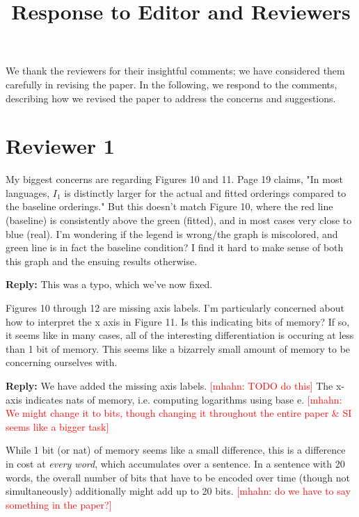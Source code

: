\documentclass{article}[11pt,a4paper,oneside]
\title{Response to Editor and Reviewers}
\newcommand\mhahn[1]{\textcolor{red}{[mhahn: #1]}}
\newenvironment{reply}
  {\par\medskip
   \color{blue}%
   \begin{framed}
   \textbf{Reply: }\ignorespaces}
 {\end{framed}
  \medskip}
\begin{document}
\maketitle

We thank the reviewers for their insightful comments; we have considered them carefully in revising the paper. In the following, we respond to the comments, describing how we revised the paper to address the concerns and suggestions.



\section{Reviewer 1}



My biggest concerns are regarding Figures 10 and 11. Page 19 claims, "In most languages, $I_1$ is distinctly larger for the actual and fitted orderings compared to the baseline orderings." But this doesn't match Figure 10, where the red line (baseline) is consistently above the green (fitted), and in most cases very close to blue (real). I'm wondering if the legend is wrong/the graph is miscolored, and green line is in fact the baseline condition? I find it hard to make sense of both this graph and the ensuing results otherwise.

\begin{reply}
This was a typo, which we've now fixed.
\end{reply}

Figures 10 through 12 are missing axis labels. I'm particularly concerned about how to interpret the x axis in Figure 11. Is this indicating bits of memory? If so, it seems like in many cases, all of the interesting differentiation is occuring at less than 1 bit of memory. This seems like a bizarrely small amount of memory to be concerning ourselves with.

\begin{reply}
We have added the missing axis labels. \mhahn{TODO do this}
The x-axis indicates nats of memory, i.e. computing logarithms using base e.
	\mhahn{We might change it to bits, though changing it throughout the entire paper \& SI seems like a bigger task}

	While 1 bit (or nat) of memory seems like a small difference, this is a difference in cost at \emph{every word}, which accumulates over a sentence.
	In a sentence with 20 words, the overall number of bits that have to be encoded over time (though not simultaneously) additionally might add up to 20 bits.
	\mhahn{do we have to say something in the paper?}
\end{reply}
\end{document}

